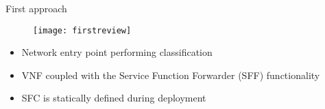 \appendix

\addtocounter{framenumber}{1}

\begin{frame}{First approach}

  \vspace{-0.5cm}

  \begin{figure}
    \centering
    \texttt{[image: firstreview]}
  \end{figure}

  \vspace{-0.4cm}

  \begin{itemize}
    \item Network entry point performing classification
    \item VNF coupled with the Service Function Forwarder (SFF) functionality
    \item SFC is statically defined during deployment
  \end{itemize}

\end{frame}